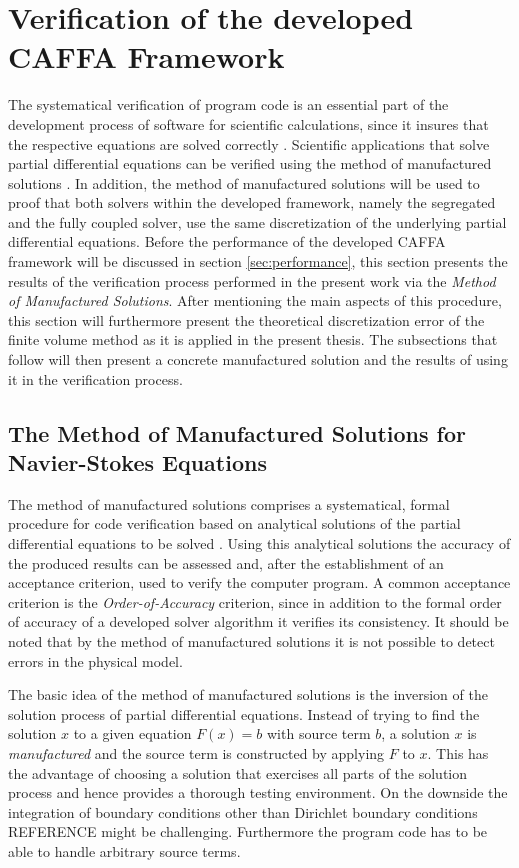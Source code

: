 \section{Verification of the developed CAFFA Framework}

The systematical verification of program code is an essential part of the development process of software for scientific calculations, since it insures that the respective equations are solved correctly \cite{oberkampf02}. Scientific applications that solve partial differential equations can be verified using the method of manufactured solutions \cite{salari00}. In addition, the method of manufactured solutions will be used to proof that both solvers within the developed framework, namely the segregated and the fully coupled solver, use the same discretization of the underlying partial differential equations. Before the performance of the developed CAFFA framework will be discussed in section \ref{sec:performance}, this section presents the results of the verification process performed in the present work via the \emph{Method of Manufactured Solutions}. After mentioning the main aspects of this procedure, this section will furthermore present the theoretical discretization error of the finite volume method as it is applied in the present thesis. The subsections that follow will then present a concrete manufactured solution and the results of using it in the verification process.

\subsection{The Method of Manufactured Solutions for Navier-Stokes Equations}

The method of manufactured solutions comprises a systematical, formal procedure for code verification based on analytical solutions of the partial differential equations to be solved \cite{salari00}. Using this analytical solutions the accuracy of the produced results can be assessed and, after the establishment of an acceptance criterion, used to verify the computer program. A common acceptance criterion is the \emph{Order-of-Accuracy} criterion, since in addition to the formal order of accuracy of a developed solver algorithm it verifies its consistency. It should be noted that by the method of manufactured solutions it is not possible to detect errors in the physical model.

The basic idea of the method of manufactured solutions is the inversion of the solution process of partial differential equations. Instead of trying to find the solution \(x\) to a given equation \(F(x) = b\) with source term \(b\), a solution \(x\) is \emph{manufactured} and the source term is constructed by applying \(F\) to \(x\). This has the advantage of choosing a solution that exercises all parts of the solution process and hence provides a thorough testing environment. On the downside the integration of boundary conditions other than Dirichlet boundary conditions REFERENCE might be challenging. Furthermore the program code has to be able to handle arbitrary source terms. 

